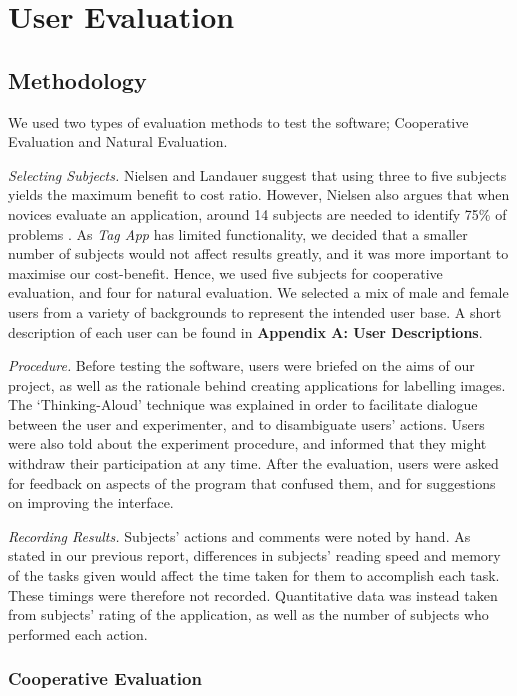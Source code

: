 \documentclass[11pt,twocolumn]{article}
\begin{document}
\section{User Evaluation}

\subsection{Methodology}

We used two types of evaluation methods to test the software; Cooperative Evaluation and Natural Evaluation. 

\emph{ Selecting Subjects.} Nielsen and Landauer suggest that using three to five subjects yields the maximum benefit to cost ratio\cite{nielsen1993}. However, Nielsen also argues that when novices evaluate an application, around 14 subjects are needed to identify 75\% of problems \cite{nielsen19932}. As \emph{Tag App} has limited functionality, we decided that a smaller number of subjects would not affect results greatly, and it was more important to maximise our cost-benefit. Hence, we used five subjects for cooperative evaluation, and four for natural evaluation. We selected a mix of male and female users from a variety of backgrounds to represent the intended user base. A short description of each user can be found in {\bf Appendix A: User Descriptions}.

\emph{Procedure.} Before testing the software, users were briefed on the aims of our project, as well as the rationale behind creating applications for labelling images. The `Thinking-Aloud' technique was explained in order to facilitate dialogue between the user and experimenter, and to disambiguate users’ actions. Users were also told about the experiment procedure, and informed that they might withdraw their participation at any time. After the evaluation, users were asked for feedback on aspects of the program that confused them, and for suggestions on improving the interface.

\emph{Recording Results.} Subjects' actions and comments were noted by hand. As stated in our previous report, differences in subjects' reading speed and memory of the tasks given would affect the time taken for them to accomplish each task. These timings were therefore not recorded. Quantitative data was instead taken from subjects' rating of the application, as well as the number of subjects who performed each action.

\subsubsection{Cooperative Evaluation}
\end{document}
